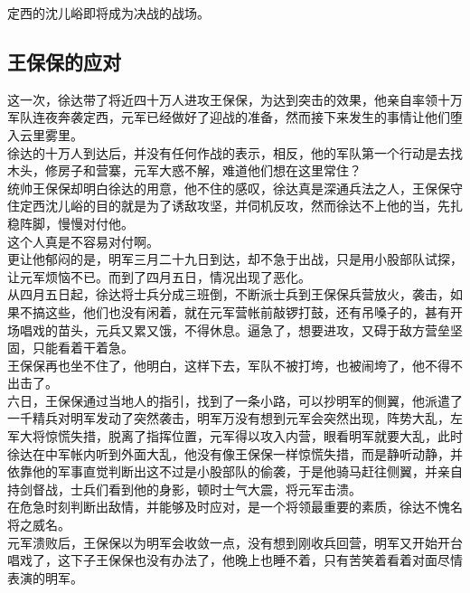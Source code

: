 \begin{multicols}{\theparacolNo}
定西的沈儿峪即将成为决战的战场。\\

\subsection{王保保的应对}
这一次，徐达带了将近四十万人进攻王保保，为达到突击的效果，他亲自率领十万军队连夜奔袭定西，元军已经做好了迎战的准备，然而接下来发生的事情让他们堕入云里雾里。\\

徐达的十万人到达后，并没有任何作战的表示，相反，他的军队第一个行动是去找木头，修房子和营寨，元军大惑不解，难道他们想在这里常住？\\

统帅王保保却明白徐达的用意，他不住的感叹，徐达真是深通兵法之人，王保保守住定西沈儿峪的目的就是为了诱敌攻坚，并伺机反攻，然而徐达不上他的当，先扎稳阵脚，慢慢对付他。\\

这个人真是不容易对付啊。\\

更让他郁闷的是，明军三月二十九日到达，却不急于出战，只是用小股部队试探，让元军烦恼不已。而到了四月五日，情况出现了恶化。\\

从四月五日起，徐达将士兵分成三班倒，不断派士兵到王保保兵营放火，袭击，如果不搞这些，他们也没有闲着，就在元军营帐前敲锣打鼓，还有吊嗓子的，甚有开场唱戏的苗头，元兵又累又饿，不得休息。逼急了，想要进攻，又碍于敌方营垒坚固，只能看着干着急。\\

王保保再也坐不住了，他明白，这样下去，军队不被打垮，也被闹垮了，他不得不出击了。\\

六日，王保保通过当地人的指引，找到了一条小路，可以抄明军的侧翼，他派遣了一千精兵对明军发动了突然袭击，明军万没有想到元军会突然出现，阵势大乱，左军大将惊慌失措，脱离了指挥位置，元军得以攻入内营，眼看明军就要大乱，此时徐达在中军帐内听到外面大乱，他没有像王保保一样惊慌失措，而是静听动静，并依靠他的军事直觉判断出这不过是小股部队的偷袭，于是他骑马赶往侧翼，并亲自持剑督战，士兵们看到他的身影，顿时士气大震，将元军击溃。\\

在危急时刻判断出敌情，并能够及时应对，是一个将领最重要的素质，徐达不愧名将之威名。\\

元军溃败后，王保保以为明军会收敛一点，没有想到刚收兵回营，明军又开始开台唱戏了，这下子王保保也没有办法了，他晚上也睡不着，只有苦笑着看着对面尽情表演的明军。\\


\end{multicols}
